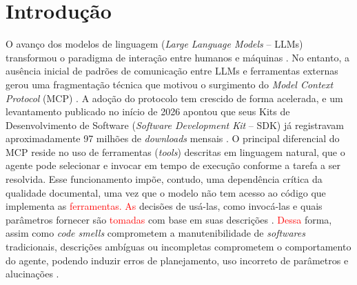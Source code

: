 \section{Introdução}
\label{sec:introducao}

O avanço dos modelos de linguagem (\textit{Large Language Models} -- LLMs) transformou o paradigma de interação entre humanos e máquinas \textcolor{red}{\cite{mcpAtFirstGlance}}. No entanto, a ausência inicial de padrões de comunicação entre LLMs e ferramentas externas gerou uma fragmentação técnica que motivou o surgimento do \textit{Model Context Protocol} (MCP) \textcolor{red}{\cite{shi2026description}}. A adoção do protocolo tem crescido de forma acelerada, e um levantamento publicado no início de 2026 apontou que seus Kits de Desenvolvimento de Software (\textit{Software Development Kit} -- SDK) já registravam aproximadamente 97 milhões de \textit{downloads} mensais \cite{Avaya2026}. O principal diferencial do MCP reside no uso de ferramentas (\textit{tools}) descritas em linguagem natural, que o agente pode selecionar e invocar em tempo de execução conforme a tarefa a ser resolvida. Esse funcionamento impõe, contudo, uma dependência crítica da qualidade documental, uma vez que o modelo não tem acesso ao código que implementa as \textcolor{red}{ferramentas. As} decisões de usá-las, como invocá-las e quais parâmetros fornecer são \textcolor{red}{tomadas} com base em suas descrições \cite{shi2026description, 2025arXiv250814704L}. \textcolor{red}{Dessa} forma, assim como \textit{code smells} comprometem a manutenibilidade de \textit{softwares} tradicionais, descrições ambíguas ou incompletas comprometem o comportamento do agente, podendo induzir erros de planejamento, uso incorreto de parâmetros e alucinações \cite{2026arXiv260214878M}.


